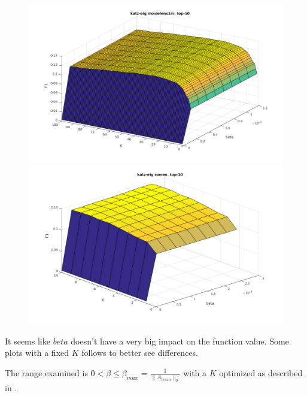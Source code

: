 \begin{figure}[h!]
\centering
\begin{minipage}{.5\textwidth}
    \centering
    \includegraphics[width=\linewidth]{fig/katzeig_beta_k/movielens_katzeig.png}
\end{minipage}%
\begin{minipage}{.5\textwidth}
    \centering
    \includegraphics[width=\linewidth]{fig/katzeig_beta_k/romeo_katzeig.png}
\end{minipage}
\end{figure}




It seems like $beta$ doesn't have a very big impact on the function value. Some plots with a fixed $K$ follows to better see differences.

The range examined is $0 < \beta \leq \beta_{max} = \frac{1}{\|A_{train}\|_2}$ with a $K$ optimized as described in .

